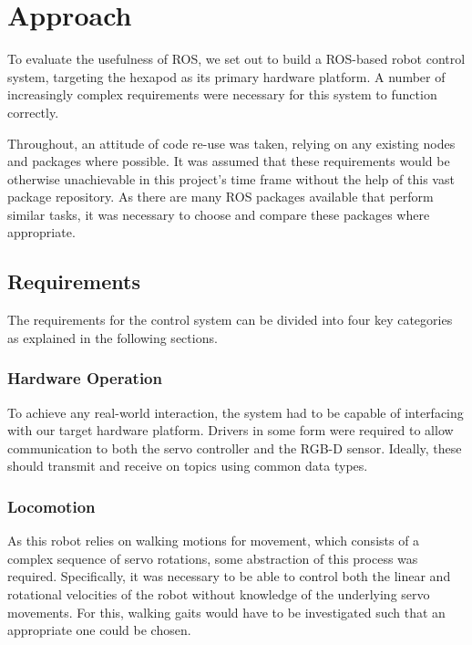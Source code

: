 \chapter{Approach}
\label{chap:approach}

To evaluate the usefulness of ROS, we set out to build a ROS-based robot control system, targeting the hexapod as its primary hardware platform. A number of increasingly complex requirements were necessary for this system to function correctly.

Throughout, an attitude of code re-use was taken, relying on any existing nodes and packages where possible. It was assumed that these requirements would be otherwise unachievable in this project's time frame without the help of this vast package repository. As there are many ROS packages available that perform similar tasks, it was necessary to choose and compare these packages where appropriate. 


\section{Requirements}

The requirements for the control system can be divided into four key categories as explained in the following sections.

\subsection{Hardware Operation}

To achieve any real-world interaction, the system had to be capable of interfacing with our target hardware platform. Drivers in some form were required to allow communication to both the servo controller and the RGB-D sensor. Ideally, these should transmit and receive on topics using common data types.

\subsection{Locomotion}

As this robot relies on walking motions for movement, which consists of a complex sequence of servo rotations, some abstraction of this process was required. Specifically, it was necessary to be able to control both the linear and rotational velocities of the robot without knowledge of the underlying servo movements. For this, walking gaits would have to be investigated such that an appropriate one could be chosen.

